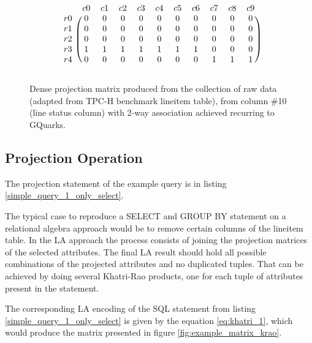 \begin{figure}[H]
\centering
\caption{Dense projection matrix produced from the collection of raw data (adapted from TPC-H benchmark lineitem table), from column \#10 (line status column) with 2-way association achieved recurring to GQuarks.}
\[
\begin{blockarray}{ccccccccccc}
	&	c0	&	c1	&	c2	&	c3	&	c4	&	c5	&	c6	&	c7	&	c8	&	c9	\\
\begin{block}{c(cccccccccc)}
r0	&	0	&	0	&	0	&	0	&	0	&	0	&	0	&	0	&	0	&	0	\\
r1	&	0	&	0	&	0	&	0	&	0	&	0	&	0	&	0	&	0	&	0	\\
r2	&	0	&	0	&	0	&	0	&	0	&	0	&	0	&	0	&	0	&	0	\\
r3	&	1	&	1	&	1	&	1	&	1	&	1	&	1	&	0	&	0	&	0	\\
r4	&	0	&	0	&	0	&	0	&	0	&	0	&	0	&	1	&	1	&	1	\\
\end{block}
\end{blockarray}
\]
\label{fig:example_matrix_10}
\end{figure}
    
    \subsection{Projection Operation}

The projection statement of the example query is in listing \ref{simple_query_1_only_select}.


 The typical case to reproduce a SELECT and GROUP BY statement on a relational algebra approach would be to remove certain columns of the lineitem table. 
 In the LA approach the process consists of joining the projection matrices of the selected attributes. 
 The final LA result should hold all possible combinations
of the projected attributes and no duplicated tuples. That can be achieved by doing several Khatri-Rao products, one for each tuple of attributes present in the statement.\par 
The corresponding LA encoding of the SQL statement from listing \ref{simple_query_1_only_select} is given by the equation \ref{eq:khatri_1}, which would produce the matrix presented in figure \ref{fig:example_matrix_krao}.
 
